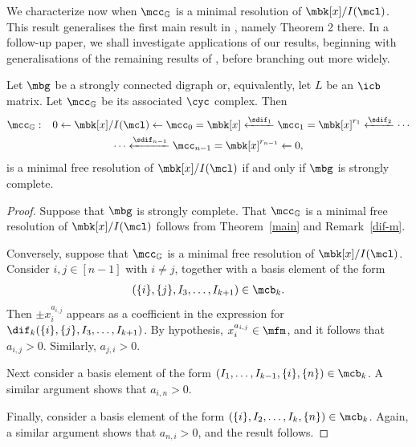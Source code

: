 
We characterize now when $\mcc_{\mathbb{G}}$ is a minimal resolution
of $\mbk[x]/I(\mcl)$. This result generalises the first main result in
\cite{ms}, namely Theorem 2 there. In a follow-up paper, we shall
investigate applications of our results, beginning with
generalisations of the remaining results of \cite{ms}, before
branching out more widely.

\begin{corollary}\label{min-resolution}
Let $\mbg$ be a strongly connected digraph or, equivalently, let $L$
be an $\icb$ matrix. Let $\mcc_{\mathbb{G}}$ be its associated $\cyc$
complex. Then
\begin{multline*}
\mcc_{\mathbb{G}}:\phantom{+} 0\leftarrow \mbk[x]/I(\mcl)\leftarrow
\mcc_0=\mbk[x]\xleftarrow{\sdif_1} \mcc_1=\mbk[x]^{r_1}
\xleftarrow{\sdif_2} \cdots \\ \cdots 
\xleftarrow{\sdif_{n-1}}\mcc_{n-1}=\mbk[x]^{r_{n-1}}\xleftarrow{} 0,
\end{multline*}
is a minimal free resolution of $\mbk[x]/I(\mcl)$ if and only if
$\mbg$ is strongly complete.
\end{corollary}
\begin{proof}
Suppose that $\mbg$ is strongly complete. That $\mcc_{\mathbb{G}}$ is
a minimal free resolution of $\mbk[x]/I(\mcl)$ follows from
Theorem~\ref{main} and Remark~\ref{dif-m}.

Conversely, suppose that $\mcc_{\mathbb{G}}$ is a minimal free
resolution of $\mbk[x]/I(\mcl)$. Consider $i,j\in [n-1]$ with $i\neq
j$, together with a basis element of the form 
\begin{eqnarray*}
(\{i\},\{j\},I_3,\ldots ,I_{k+1})\in\mcb_k.
\end{eqnarray*}
Then $\pm x^{a_{i,j}}_i$ appears as a coefficient in the expression
for $\dif_k(\{i\},\{j\},I_3,\ldots ,I_{k+1})$. By hypothesis,
$x^{a_{i,j}}_i\in\mfm$, and it follows that $a_{i,j}>0$. Similarly,
$a_{j,i}>0$.

Next consider a basis element of the form $(I_1,\ldots
,I_{k-1},\{i\},\{n\})\in\mcb_k$. A similar argument shows that
$a_{i,n}>0$.

Finally, consider a basis element of the form $(\{i\},I_2,\ldots
,I_k,\{n\})\in\mcb_k$. Again, a similar argument shows that
$a_{n,i}>0$, and the result follows.
\end{proof}
